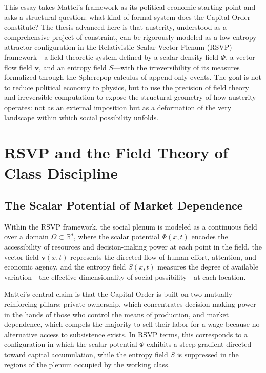 \documentclass[12pt,a4paper]{article}
\begin{document}
This essay takes Mattei's framework as its political-economic starting point and asks a structural question: what kind of formal system does the Capital Order constitute? The thesis advanced here is that austerity, understood as a comprehensive project of constraint, can be rigorously modeled as a low-entropy attractor configuration in the Relativistic Scalar-Vector Plenum (RSVP) framework---a field-theoretic system defined by a scalar density field $\Phi$, a vector flow field $\mathbf{v}$, and an entropy field $S$---with the irreversibility of its measures formalized through the Spherepop calculus of append-only events. The goal is not to reduce political economy to physics, but to use the precision of field theory and irreversible computation to expose the structural geometry of how austerity operates: not as an external imposition but as a deformation of the very landscape within which social possibility unfolds.

\section{RSVP and the Field Theory of Class Discipline}

\subsection{The Scalar Potential of Market Dependence}

Within the RSVP framework, the social plenum is modeled as a continuous field over a domain $\Omega \subset \mathbb{R}^d$, where the scalar potential $\Phi(x,t)$ encodes the accessibility of resources and decision-making power at each point in the field, the vector field $\mathbf{v}(x,t)$ represents the directed flow of human effort, attention, and economic agency, and the entropy field $S(x,t)$ measures the degree of available variation---the effective dimensionality of social possibility---at each location.

Mattei's central claim is that the Capital Order is built on two mutually reinforcing pillars: private ownership, which concentrates decision-making power in the hands of those who control the means of production, and market dependence, which compels the majority to sell their labor for a wage because no alternative access to subsistence exists. In RSVP terms, this corresponds to a configuration in which the scalar potential $\Phi$ exhibits a steep gradient directed toward capital accumulation, while the entropy field $S$ is suppressed in the regions of the plenum occupied by the working class.
\end{document}
